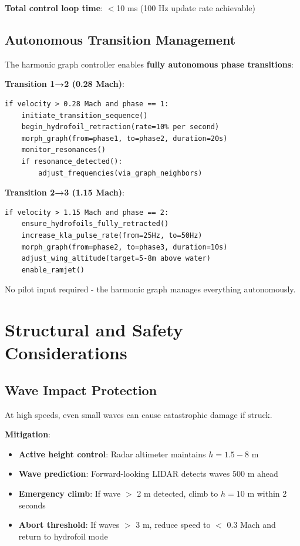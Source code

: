 \documentclass[12pt,a4paper]{article}
\begin{document}
\textbf{Total control loop time}: $<$10 ms (100 Hz update rate achievable)

\subsection{Autonomous Transition Management}

The harmonic graph controller enables \textbf{fully autonomous phase transitions}:

\textbf{Transition 1→2 (0.28 Mach)}:
\begin{verbatim}
if velocity > 0.28 Mach and phase == 1:
    initiate_transition_sequence()
    begin_hydrofoil_retraction(rate=10% per second)
    morph_graph(from=phase1, to=phase2, duration=20s)
    monitor_resonances()
    if resonance_detected():
        adjust_frequencies(via_graph_neighbors)
\end{verbatim}

\textbf{Transition 2→3 (1.15 Mach)}:
\begin{verbatim}
if velocity > 1.15 Mach and phase == 2:
    ensure_hydrofoils_fully_retracted()
    increase_kla_pulse_rate(from=25Hz, to=50Hz)
    morph_graph(from=phase2, to=phase3, duration=10s)
    adjust_wing_altitude(target=5-8m above water)
    enable_ramjet()
\end{verbatim}

No pilot input required - the harmonic graph manages everything autonomously.

\section{Structural and Safety Considerations}

\subsection{Wave Impact Protection}

At high speeds, even small waves can cause catastrophic damage if struck.

\textbf{Mitigation}:
\begin{itemize}
\item \textbf{Active height control}: Radar altimeter maintains $h = 1.5-8$ m
\item \textbf{Wave prediction}: Forward-looking LIDAR detects waves 500 m ahead
\item \textbf{Emergency climb}: If wave $>$ 2 m detected, climb to $h = 10$ m within 2 seconds
\item \textbf{Abort threshold}: If waves $>$ 3 m, reduce speed to $<$ 0.3 Mach and return to hydrofoil mode
\end{itemize}
\end{document}

